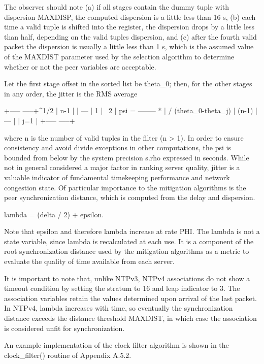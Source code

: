 The observer should note (a) if all stages contain the dummy tuple
with dispersion MAXDISP, the computed dispersion is a little less
than 16 s, (b) each time a valid tuple is shifted into the register,
the dispersion drops by a little less than half, depending on the
valid tuples dispersion, and (c) after the fourth valid packet the
dispersion is usually a little less than 1 s, which is the assumed
value of the MAXDIST parameter used by the selection algorithm to
determine whether or not the peer variables are acceptable.

Let the first stage offset in the sorted list be theta_0; then, for
the other stages in any order, the jitter is the RMS average

                      +-----                 -----+^1/2
                      |  n-1                      |
                      |  ---                      |
              1       |  \                     2  |
  psi   =  -------- * |  /    (theta_0-theta_j)   |
            (n-1)     |  ---                      |
                      |  j=1                      |
                      +-----                 -----+

where n is the number of valid tuples in the filter (n > 1).  In
order to ensure consistency and avoid divide exceptions in other
computations, the psi is bounded from below by the system precision
s.rho expressed in seconds.  While not in general considered a major
factor in ranking server quality, jitter is a valuable indicator of
fundamental timekeeping performance and network congestion state.  Of
particular importance to the mitigation algorithms is the peer
synchronization distance, which is computed from the delay and
dispersion.

lambda = (delta / 2) + epsilon.

Note that epsilon and therefore lambda increase at rate PHI.  The
lambda is not a state variable, since lambda is recalculated at each
use.  It is a component of the root synchronization distance used by
the mitigation algorithms as a metric to evaluate the quality of time
available from each server.

It is important to note that, unlike NTPv3, NTPv4 associations do not
show a timeout condition by setting the stratum to 16 and leap
indicator to 3.  The association variables retain the values
determined upon arrival of the last packet.  In NTPv4, lambda
increases with time, so eventually the synchronization distance
exceeds the distance threshold MAXDIST, in which case the association
is considered unfit for synchronization.

An example implementation of the clock filter algorithm is shown in
the clock_filter() routine of Appendix A.5.2.

